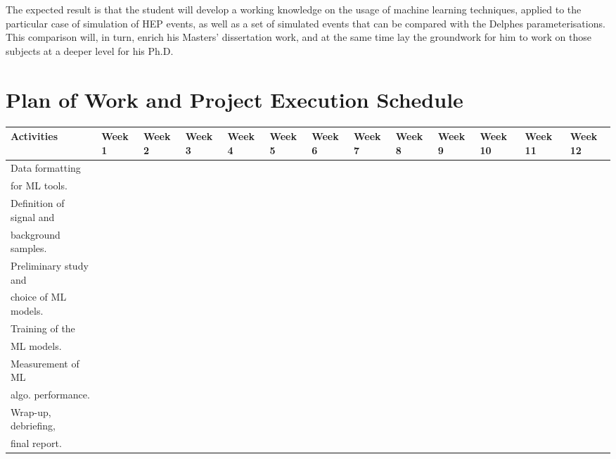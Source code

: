 \documentclass[12pt,a4paper]{sprace}
\newcommand{\Vz}{\cellcolor[gray]{1.0}\phantom{xxx}}
\newcommand{\MT}{\cellcolor[gray]{0.75}\phantom{xxx}}
\begin{document}
The expected result is that the student will develop a working knowledge on the usage of machine learning techniques, applied to the particular case of simulation of HEP events, as well as a set of simulated events that can be compared with the Delphes parameterisations. This comparison will, in turn, enrich his Masters' dissertation work, and at the same time lay the groundwork for him to work on those subjects at a deeper level for his Ph.D.

\clearpage
\section{Plan of Work and Project Execution Schedule}

\begin{table}[htbp]
\rule{0pt}{0.1\baselineskip}

\tiny
\centering
\begin{tabular}{|l|l|l|l|l|l|l|l|l|l|l|l|l|}
\hline
\textbf{Activities} & 
\textbf{Week 1} & \textbf{Week 2} & \textbf{Week 3} & \textbf{Week 4} &
\textbf{Week 5} & \textbf{Week 6} & \textbf{Week 7} & \textbf{Week 8}  &
\textbf{Week 9} & \textbf{Week 10} & \textbf{Week 11} & \textbf{Week 12}  \\
\hline
Data formatting & \MT & \MT & \Vz & \Vz & \Vz & \Vz & \Vz & \Vz & \Vz & \Vz & \Vz & \Vz\\
for ML tools.  	& \MT & \MT & \Vz & \Vz & \Vz & \Vz & \Vz & \Vz & \Vz & \Vz & \Vz & \Vz \\
\hline
Definition of signal and & \Vz & \MT & \MT & \MT &  \Vz &  \Vz & \Vz & \Vz &  \Vz &  \Vz & \Vz & \Vz \\
background samples.      & \Vz & \MT & \MT & \MT &  \Vz &  \Vz & \Vz & \Vz &  \Vz &  \Vz & \Vz & \Vz \\
\hline
Preliminary study and  & \Vz & \Vz & \MT & \MT &  \MT &  \Vz & \Vz & \Vz &  \Vz &  \Vz & \Vz & \Vz \\
choice of ML models.   & \Vz & \Vz & \MT & \MT &  \MT &  \Vz & \Vz & \Vz &  \Vz &  \Vz & \Vz & \Vz \\
\hline
Training of the   & \Vz & \Vz & \Vz  & \MT &  \MT &  \MT & \MT &  \MT &  \MT &  \Vz & \Vz & \Vz \\
ML models.        & \Vz & \Vz & \Vz  & \MT &  \MT &  \MT & \MT &  \MT &  \MT &  \Vz & \Vz & \Vz \\
\hline
Measurement of ML  & \Vz & \Vz & \Vz & \Vz & \MT &  \MT & \MT & \MT  & \MT & \MT & \Vz & \Vz \\
algo. performance. & \Vz & \Vz & \Vz & \Vz & \MT &  \MT & \MT & \MT  & \MT & \MT & \Vz & \Vz \\
\hline
Wrap-up, debriefing,& \Vz & \Vz & \Vz & \Vz & \Vz & \Vz & \Vz & \Vz &  \Vz &  \MT & \MT & \MT \\
final report.       & \Vz & \Vz & \Vz & \Vz & \Vz & \Vz & \Vz & \Vz &  \Vz &  \MT & \MT &\MT \\
\hline
\end{tabular}
\end{table}
\end{document}
